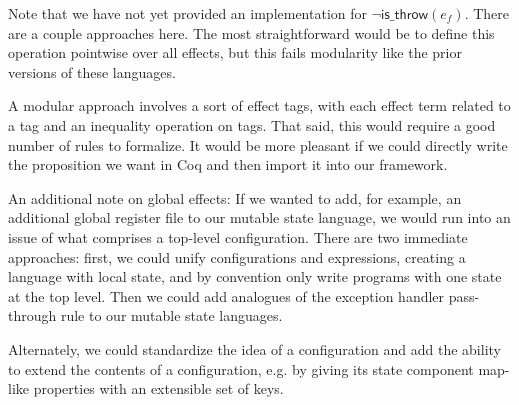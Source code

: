 \documentclass{article}
\newcommand{\lit}[1]{\textsf{#1}}
\begin{document}
Note that we have not yet provided an implementation for $\neg{\lit{is\_throw}(e_f)}$.
There are a couple approaches here.
The most straightforward would be to define this operation pointwise
over all effects, but this fails modularity like the prior versions of
these languages.

A modular approach involves a sort of effect tags, with each effect term related to a tag
and an inequality operation on tags.
That said, this would require a good number of rules to formalize.
It would be more pleasant if we could directly write the
proposition we want in Coq and then import it into our framework.

An additional note on global effects:
If we wanted to add, for example, an additional global register file to our mutable state
language, we would run into an issue of what comprises a top-level configuration.
There are two immediate approaches: first, we could unify configurations
and expressions, creating a language with local state,
and by convention only write programs with one state at the top level.
Then we could add analogues of the exception handler pass-through rule to our
mutable state languages.

Alternately, we could standardize the idea of a configuration and
add the ability to extend the contents of a configuration, e.g.
by giving its state component map-like properties with an extensible set of keys.
\end{document}
